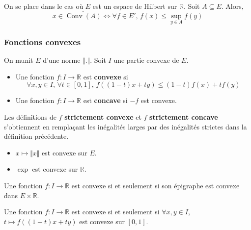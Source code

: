   \begin{corollary}
    On se place dans le cas où $E$ est un espace de Hilbert sur $\mathbb{R}$. Soit $A \subseteq E$. Alors,
    \[ x \in \overline{\operatorname{Conv}(A)} \iff \forall f \in E', \, f(x) \leq \sup_{y \in A} f(y) \]
  \end{corollary}

  \subsubsection{Fonctions convexes}

  On munit $E$ d'une norme $\Vert . \Vert$. Soit $I$ une partie convexe de $E$.


  \begin{definition}
    \begin{itemize}
      \item Une fonction $f : I \rightarrow \mathbb{R}$ est \textbf{convexe} si
      \[ \forall x, y \in I, \, \forall t \in [0,1], \, f((1-t)x + ty) \leq (1-t)f(x) + tf(y) \]
      \item Une fonction $f : I \rightarrow \mathbb{R}$ est \textbf{concave} si $-f$ est convexe.
    \end{itemize}
  \end{definition}

  \begin{remark}
    Les définitions de $f$ \textbf{strictement convexe} et $f$ \textbf{strictement concave} s'obtiennent en remplaçant les inégalités larges par des inégalités strictes dans la définition précédente.
  \end{remark}

  \begin{example}
    \begin{itemize}
      \item $x \mapsto \Vert x \Vert$ est convexe sur $E$.
      \item $\exp$ est convexe sur $\mathbb{R}$.
    \end{itemize}
  \end{example}

  \begin{proposition}
    Une fonction $f : I \rightarrow \mathbb{R}$ est convexe si et seulement si son épigraphe est convexe dans $E \times \mathbb{R}$.
  \end{proposition}

  \begin{theorem}
    Une fonction $f : I \rightarrow \mathbb{R}$ est convexe si et seulement si $\forall x, y \in I$, $t \mapsto f((1-t)x + ty)$ est convexe sur $[0,1]$.
  \end{theorem}

